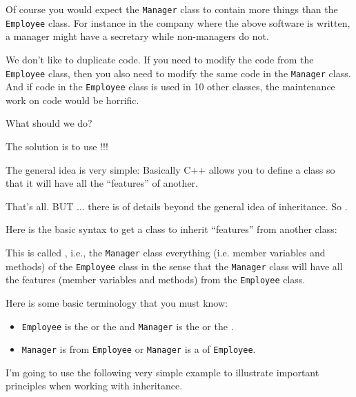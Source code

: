 Of course you would expect the \texttt{Manager} class to contain more
things than the \texttt{Employee} class. For instance in the company where
the above software is written, a manager might have a secretary while
non-managers do not.

We don't like to duplicate code. If you need to modify the code from the
\texttt{Employee} class, then you also need to modify the same code in the
\texttt{Manager} class. And if code in the \texttt{Employee} class is used
in 10 other classes, the maintenance work on code would be horrific.

What should we do?

\newpage{}

The solution is to use !!!

The general idea is very simple: Basically C++ allows you to define a
class so that it will have all the ``features'' of another.

That's all. BUT ... there is  of details beyond the
general idea of inheritance. So .

Here is the basic syntax to get a class to inherit ``features'' from
another class:

This is called , i.e., the \texttt{Manager}
class  everything (i.e. member variables and methods)
of the \texttt{Employee} class in the sense that the \texttt{Manager} class
will have all the features (member variables and methods) from the
\texttt{Employee} class.

Here is some basic terminology that you must know:

\begin{itemize}
\item
  \texttt{Employee} is the  or the
   and \texttt{Manager} is the  or
  the .
\item
  \texttt{Manager} is  from \texttt{Employee} or
  \texttt{Manager} is a  of \texttt{Employee}.
\end{itemize}

I'm going to use the following very simple example to illustrate
important principles when working with inheritance.

